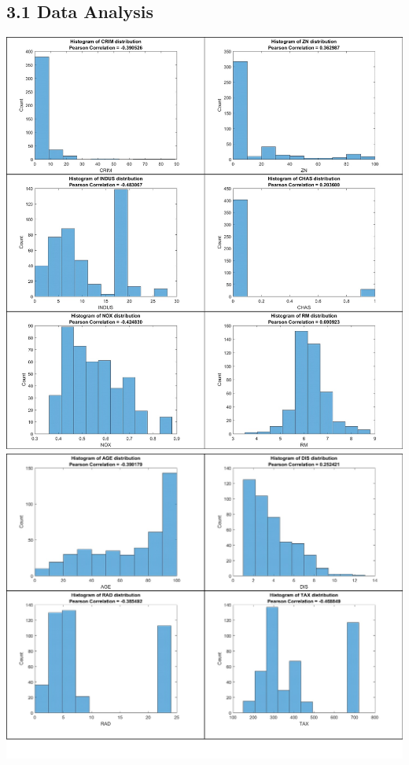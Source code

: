 \documentclass[12pt]{article}
\begin{document}
\subsection*{3.1 Data Analysis}
\includegraphics[width=\textwidth]{Hist1.jpg}
\includegraphics[width=\textwidth]{Hist2.jpg}
\end{document}
